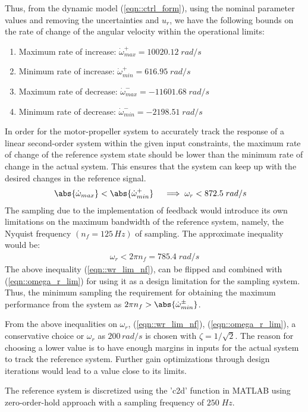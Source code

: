 Thus, from the dynamic model (\ref{eqn::ctrl_form}), using the nominal parameter
values and removing the uncertainties and $u_r$, we have the
following bounds on the rate of change of the angular velocity within the
operational limits:
\begin{enumerate}
    \item Maximum rate of increase:
        $\dot \omega^{+}_{max} = 10020.12 \; rad/s$
    \item Minimum rate of increase:
    $\dot \omega^{+}_{min} = 616.95 \; rad/s$
    \item Maximum rate of decrease:
        $\dot \omega^{-}_{max} = -11601.68 \; rad/s$
    \item Minimum rate of decrease:
        $\dot \omega^{-}_{min} = -2198.51 \; rad/s$
\end{enumerate}
In order for the motor-propeller system to accurately track the response of a linear second-order system within the given input constraints, the maximum rate of change of the reference system state should be lower than the minimum rate of change in the actual system. This ensures that the system can keep up with the desired changes in the reference signal.
\begin{align}
    \abs{\dot \omega_{max}} &< \abs{\dot \omega^{+}_{min}} \quad
    \implies \omega_r <  872.5 \; rad/s
    \label{eqn::omega_r_lim}
\end{align}
The sampling due to the implementation of feedback would introduce its own
limitations on the maximum bandwidth of the reference system, namely, the
Nyquist frequency $(n_f = 125\,Hz)$ of sampling. The approximate inequality would be:
\begin{align}
    \omega_r < 2 \pi n_f = 785.4 \; rad/s
    \label{eqn::wr_lim_nf}
\end{align}
The above inequality (\ref{eqn::wr_lim_nf}), can be
flipped and combined with (\ref{eqn::omega_r_lim}) for using it as a design
limitation for the sampling system. Thus, the minimum sampling the requirement
for obtaining the maximum performance from the system as $2 \pi n_f > {\abs{\dot \omega^{\pm}_{min}}}$.

From the above inequalities on $\omega_r$, (\ref{eqn::wr_lim_nf}),
(\ref{eqn::omega_r_lim}), a conservative choice or $\omega_r$ as $200 \, rad/s$ is
chosen with $\zeta = {1}/{\sqrt{2}}$. The reason for choosing a lower value
is to have enough margins in inputs for the actual system to track the reference
system. Further gain optimizations through design iterations would lead to a
value close to its limits.

The reference system is discretized using the 'c2d' function in MATLAB using
zero-order-hold approach with a sampling frequency of $250 \; Hz$.
